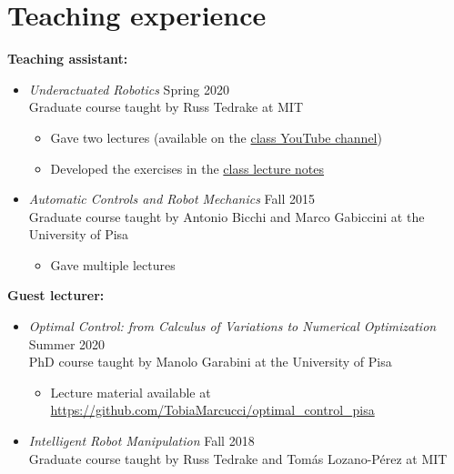 \documentclass[11pt,a4paper,sans]{moderncv}
\begin{document}
\section{Teaching experience}

\vspace{5pt}

\textbf{Teaching assistant:}

\vspace{5pt}

\begin{itemize}

\item \textit{Underactuated  Robotics} \hfill Spring 2020 \\
Graduate course taught by Russ Tedrake at MIT
\begin{itemize}
\item
Gave two lectures (available on the  \href{https://www.youtube.com/playlist?list=PLkx8KyIQkMfX1WpWYqtep7TOmboZeDtev}{\color{cyan}class YouTube channel})
\item
Developed the exercises in the \href{http://underactuated.csail.mit.edu}{\color{cyan}class lecture notes}
\end{itemize}

\item \textit{Automatic Controls and Robot Mechanics} \hfill Fall 2015 \\
Graduate course taught by Antonio Bicchi and Marco Gabiccini at the University of Pisa
\begin{itemize}
\item
Gave multiple lectures
\end{itemize}

\end{itemize}

\vspace{5pt}

\textbf{Guest lecturer:}

\vspace{5pt}

\begin{itemize}

\item \textit{Optimal Control: from Calculus of Variations to Numerical Optimization} \hfill Summer 2020 \\
PhD course taught by Manolo Garabini at the University of Pisa
\begin{itemize}
\item
Lecture material available at \href{https://github.com/TobiaMarcucci/optimal_control_pisa}{\color{cyan}https://github.com/TobiaMarcucci/optimal\_control\_pisa}
\end{itemize}

\item \textit{Intelligent Robot Manipulation} \hfill Fall 2018 \\
Graduate course taught by Russ Tedrake and Tom\'{a}s Lozano-P\'{e}rez at MIT

\end{itemize}
\end{document}
